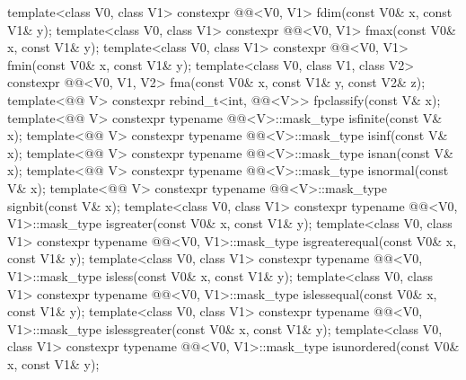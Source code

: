 \begin{itemdecl}
template<class V0, class V1>
  constexpr @@<V0, V1> fdim(const V0& x, const V1& y);
template<class V0, class V1>
  constexpr @@<V0, V1> fmax(const V0& x, const V1& y);
template<class V0, class V1>
  constexpr @@<V0, V1> fmin(const V0& x, const V1& y);
template<class V0, class V1, class V2>
  constexpr @@<V0, V1, V2> fma(const V0& x, const V1& y, const V2& z);
template<@@ V>
  constexpr rebind_t<int, @@<V>> fpclassify(const V& x);
template<@@ V>
  constexpr typename @@<V>::mask_type isfinite(const V& x);
template<@@ V>
  constexpr typename @@<V>::mask_type isinf(const V& x);
template<@@ V>
  constexpr typename @@<V>::mask_type isnan(const V& x);
template<@@ V>
  constexpr typename @@<V>::mask_type isnormal(const V& x);
template<@@ V>
  constexpr typename @@<V>::mask_type signbit(const V& x);
template<class V0, class V1>
  constexpr typename @@<V0, V1>::mask_type isgreater(const V0& x, const V1& y);
template<class V0, class V1>
  constexpr typename @@<V0, V1>::mask_type
    isgreaterequal(const V0& x, const V1& y);
template<class V0, class V1>
  constexpr typename @@<V0, V1>::mask_type isless(const V0& x, const V1& y);
template<class V0, class V1>
  constexpr typename @@<V0, V1>::mask_type islessequal(const V0& x, const V1& y);
template<class V0, class V1>
  constexpr typename @@<V0, V1>::mask_type islessgreater(const V0& x, const V1& y);
template<class V0, class V1>
  constexpr typename @@<V0, V1>::mask_type isunordered(const V0& x, const V1& y);
\end{itemdecl}

